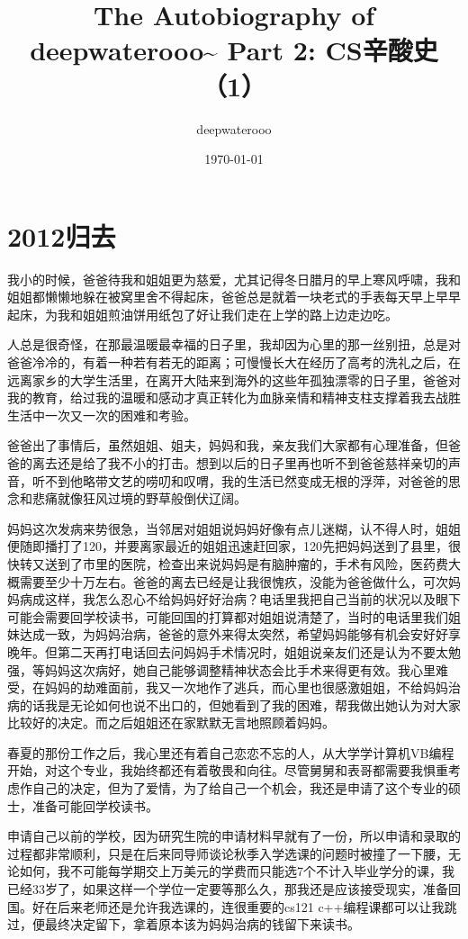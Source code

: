 \documentclass[12pt]{book}
\author{deepwaterooo}
\date{\today}
\title{The Autobiography of deepwaterooo\textasciitilde{} \linebreak Part 2: CS辛酸史（1）}
\begin{document}
\maketitle
\tableofcontents


\chapter{2012归去}
\label{sec-1}

我小的时候，爸爸待我和姐姐更为慈爱，尤其记得冬日腊月的早上寒风呼啸，我和姐姐都懒懒地躲在被窝里舍不得起床，爸爸总是就着一块老式的手表每天早上早早起床，为我和姐姐煎油饼用纸包了好让我们走在上学的路上边走边吃。

人总是很奇怪，在那最温暖最幸福的日子里，我却因为心里的那一丝别扭，总是对爸爸冷冷的，有着一种若有若无的距离；可慢慢长大在经历了高考的洗礼之后，在远离家乡的大学生活里，在离开大陆来到海外的这些年孤独漂零的日子里，爸爸对我的教育，给过我的温暖和感动才真正转化为血脉亲情和精神支柱支撑着我去战胜生活中一次又一次的困难和考验。

爸爸出了事情后，虽然姐姐、姐夫，妈妈和我，亲友我们大家都有心理准备，但爸爸的离去还是给了我不小的打击。想到以后的日子里再也听不到爸爸慈祥亲切的声音，听不到他略带文艺的唠叨和叹喟，我的生活已然变成无根的浮萍，对爸爸的思念和悲痛就像狂风过境的野草般倒伏辽阔。

妈妈这次发病来势很急，当邻居对姐姐说妈妈好像有点儿迷糊，认不得人时，姐姐便随即播打了120，并要离家最近的姐姐迅速赶回家，120先把妈妈送到了县里，很快转又送到了市里的医院，检查出来说妈妈是有脑肿瘤的，手术有风险，医药费大概需要至少十万左右。爸爸的离去已经是让我很愧疚，没能为爸爸做什么，可次妈妈病成这样，我怎么忍心不给妈妈好好治病？电话里我把自己当前的状况以及眼下可能会需要回学校读书，可能回国的打算都对姐姐说清楚了，当时的电话里我们姐妹达成一致，为妈妈治病，爸爸的意外来得太突然，希望妈妈能够有机会安好好享晚年。但第二天再打电话回去问妈妈手术情况时，姐姐说亲友们还是认为不要太勉强，等妈妈这次病好，她自己能够调整精神状态会比手术来得更有效。我心里难受，在妈妈的劫难面前，我又一次地作了逃兵，而心里也很感激姐姐，不给妈妈治病的话我是无论如何也说不出口的，但她看到了我的困难，帮我做出她认为对大家比较好的决定。而之后姐姐还在家默默无言地照顾着妈妈。

春夏的那份工作之后，我心里还有着自己恋恋不忘的人，从大学学计算机VB编程开始，对这个专业，我始终都还有着敬畏和向往。尽管舅舅和表哥都需要我惧重考虑作自己的决定，但为了爱情，为了给自己一个机会，我还是申请了这个专业的硕士，准备可能回学校读书。

申请自己以前的学校，因为研究生院的申请材料早就有了一份，所以申请和录取的过程都非常顺利，只是在后来同导师谈论秋季入学选课的问题时被撞了一下腰，无论如何，我不可能每学期交上万美元的学费而只能选7个不计入毕业学分的课，我已经33岁了，如果这样一个学位一定要等那么久，那我还是应该接受现实，准备回国。好在后来老师还是允许我选课的，连很重要的cs121 c++编程课都可以让我跳过，便最终决定留下，拿着原本该为妈妈治病的钱留下来读书。
\end{document}
